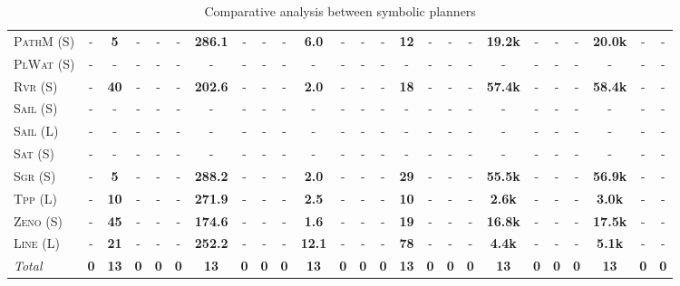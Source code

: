 \documentclass[11pt,landscape]{article}
\begin{document}
\begin{table*}[tb]
{\begin{tabular}{|l||cccc||cccc||cccc||cccc||cccc||cccc||}
\textsc{PathM} (S)&-&\textbf{5}&-&-&-&\textbf{286.1}&-&-&-&\textbf{6.0}&-&-&-&\textbf{12}&-&-&-&\textbf{19.2k}&-&-&-&\textbf{20.0k}&-&-\\
\textsc{PlWat} (S)&-&-&-&-&-&-&-&-&-&-&-&-&-&-&-&-&-&-&-&-&-&-&-&-\\
\textsc{Rvr} (S)&-&\textbf{40}&-&-&-&\textbf{202.6}&-&-&-&\textbf{2.0}&-&-&-&\textbf{18}&-&-&-&\textbf{57.4k}&-&-&-&\textbf{58.4k}&-&-\\
\textsc{Sail} (S)&-&-&-&-&-&-&-&-&-&-&-&-&-&-&-&-&-&-&-&-&-&-&-&-\\
\textsc{Sail} (L)&-&-&-&-&-&-&-&-&-&-&-&-&-&-&-&-&-&-&-&-&-&-&-&-\\
\textsc{Sat} (S)&-&-&-&-&-&-&-&-&-&-&-&-&-&-&-&-&-&-&-&-&-&-&-&-\\
\textsc{Sgr} (S)&-&\textbf{5}&-&-&-&\textbf{288.2}&-&-&-&\textbf{2.0}&-&-&-&\textbf{29}&-&-&-&\textbf{55.5k}&-&-&-&\textbf{56.9k}&-&-\\
\textsc{Tpp} (L)&-&\textbf{10}&-&-&-&\textbf{271.9}&-&-&-&\textbf{2.5}&-&-&-&\textbf{10}&-&-&-&\textbf{2.6k}&-&-&-&\textbf{3.0k}&-&-\\
\textsc{Zeno} (S)&-&\textbf{45}&-&-&-&\textbf{174.6}&-&-&-&\textbf{1.6}&-&-&-&\textbf{19}&-&-&-&\textbf{16.8k}&-&-&-&\textbf{17.5k}&-&-\\
\textsc{Line} (L)&-&\textbf{21}&-&-&-&\textbf{252.2}&-&-&-&\textbf{12.1}&-&-&-&\textbf{78}&-&-&-&\textbf{4.4k}&-&-&-&\textbf{5.1k}&-&-
\\\hline
\textit{Total}&\textbf{0}&\textbf{13}&\textbf{0}&\textbf{0}&\textbf{0}&\textbf{13}&\textbf{0}&\textbf{0}&\textbf{0}&\textbf{13}&\textbf{0}&\textbf{0}&\textbf{0}&\textbf{13}&\textbf{0}&\textbf{0}&\textbf{0}&\textbf{13}&\textbf{0}&\textbf{0}&\textbf{0}&\textbf{13}&\textbf{0}&\textbf{0}\\\hline

        \end{tabular}}
        \caption{Comparative analysis between symbolic planners}
        \label{tab:symbolic}
        \end{table*}
        
\end{document}
